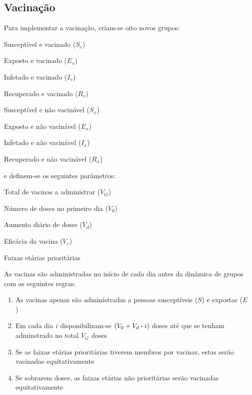 \subsection{Vacinação}
Para implementar a vacinação, criam-se oito novos grupos:
\begin{itemize}\begin{multicols}{2}
        \item Susceptível e vacinado ($S_v$)
        \item Exposto e vacinado ($E_v$)
        \item Infetado e vacinado ($I_v$)
        \item Recuperado e vacinado ($R_v$)
        \item Susceptível e não vacinável ($S_x$)
        \item Exposto e não vacinável ($E_x$)
        \item Infetado e não vacinável ($I_x$)
        \item Recuperado e não vacinável ($R_x$)
\end{multicols}\end{itemize}
e definem-se os seguintes parâmetros:
\begin{itemize}\begin{multicols}{2}\raggedcolumns
        \item Total de vacinas a administrar ($V_G$)
        \item Número de doses no primeiro dia ($V_0$)
        \item Aumento diário de doses ($V_d$)
        \item Eficácia da vacina ($V_e$)
        \item Faixas etárias prioritárias
\end{multicols}\end{itemize}

As vacinas são administradas no início de cada dia antes da dinâmica de grupos com as seguintes regras:
\begin{enumerate}
        \item As vacinas apenas são administradas a pessoas susceptíveis ($S$) e expostas ($E$)
        \item Em cada dia $i$ disponibilizam-se $(V_0+V_d\vdot i)$ doses até que se tenham adminstrado no total $V_G$ doses
        \item Se as faixas etárias prioritárias tiverem membros por vacinar, estas serão vacinadas equitativamente
        \item Se sobrarem doses, as faixas etárias não prioritárias serão vacinadas equitativamente
\end{enumerate}

